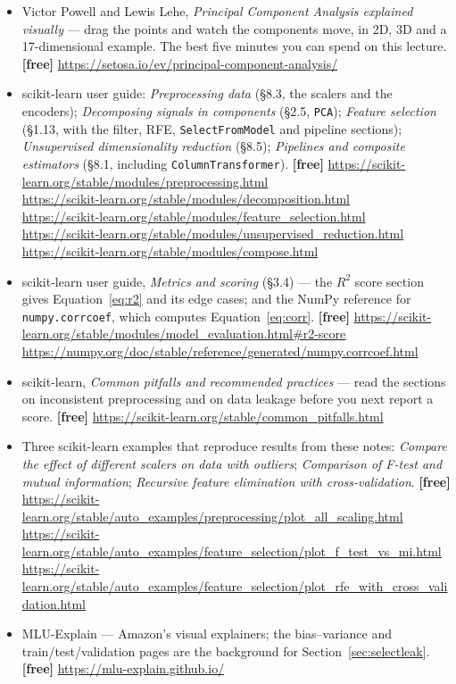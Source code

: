 \documentclass[11pt]{article}
\begin{document}
\begin{itemize}[leftmargin=*]
  \item Victor Powell and Lewis Lehe, \emph{Principal Component Analysis
    explained visually} --- drag the points and watch the components move,
    in 2D, 3D and a 17-dimensional example. The best five minutes you can
    spend on this lecture. \textbf{[free]}
    \url{https://setosa.io/ev/principal-component-analysis/}
  \item scikit-learn user guide: \emph{Preprocessing data} (\S8.3, the
    scalers and the encoders); \emph{Decomposing signals in components}
    (\S2.5, \texttt{PCA}); \emph{Feature selection} (\S1.13, with the
    filter, RFE, \texttt{SelectFromModel} and pipeline sections);
    \emph{Unsupervised dimensionality reduction} (\S8.5); \emph{Pipelines and
    composite estimators} (\S8.1, including
    \texttt{ColumnTransformer}). \textbf{[free]}
    \url{https://scikit-learn.org/stable/modules/preprocessing.html} \\
    \url{https://scikit-learn.org/stable/modules/decomposition.html} \\
    \url{https://scikit-learn.org/stable/modules/feature_selection.html} \\
    \url{https://scikit-learn.org/stable/modules/unsupervised_reduction.html} \\
    \url{https://scikit-learn.org/stable/modules/compose.html}
  \item scikit-learn user guide, \emph{Metrics and scoring} (\S3.4) --- the
    $R^2$ score section gives Equation~\eqref{eq:r2} and its edge cases; and
    the NumPy reference for \texttt{numpy.corrcoef}, which computes
    Equation~\eqref{eq:corr}. \textbf{[free]}
    \url{https://scikit-learn.org/stable/modules/model_evaluation.html#r2-score} \\
    \url{https://numpy.org/doc/stable/reference/generated/numpy.corrcoef.html}
  \item scikit-learn, \emph{Common pitfalls and recommended practices} ---
    read the sections on inconsistent preprocessing and on data leakage before
    you next report a score. \textbf{[free]}
    \url{https://scikit-learn.org/stable/common_pitfalls.html}
  \item Three scikit-learn examples that reproduce results from these notes:
    \emph{Compare the effect of different scalers on data with outliers};
    \emph{Comparison of F-test and mutual information}; \emph{Recursive
    feature elimination with cross-validation}. \textbf{[free]}
    \url{https://scikit-learn.org/stable/auto_examples/preprocessing/plot_all_scaling.html}
    \\
    \url{https://scikit-learn.org/stable/auto_examples/feature_selection/plot_f_test_vs_mi.html}
    \\
    \url{https://scikit-learn.org/stable/auto_examples/feature_selection/plot_rfe_with_cross_validation.html}
  \item MLU-Explain --- Amazon's visual explainers; the bias--variance and
    train/test/validation pages are the background for
    Section~\ref{sec:selectleak}. \textbf{[free]}
    \url{https://mlu-explain.github.io/}
\end{itemize}

\enlargethispage{4\baselineskip}
\notesources{\AMLUnitIVSources}
\end{document}
